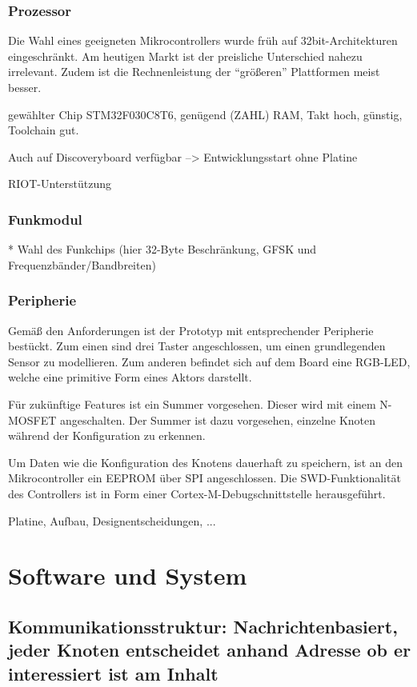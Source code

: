 \documentclass{IEEEtran}
\begin{document}
\subsubsection{Prozessor}
Die Wahl eines geeigneten Mikrocontrollers wurde früh auf 32bit-Architekturen eingeschränkt.
Am heutigen Markt ist der preisliche Unterschied nahezu irrelevant.
Zudem ist die Rechnenleistung der \enquote{größeren} Plattformen meist besser.

gewählter Chip STM32F030C8T6, genügend (ZAHL) RAM, Takt hoch, günstig, Toolchain gut.

Auch auf Discoveryboard verfügbar --> Entwicklungsstart ohne Platine

RIOT-Unterstützung

\subsubsection{Funkmodul}
* Wahl des Funkchips (hier 32-Byte Beschränkung, GFSK und Frequenzbänder/Bandbreiten)

\subsubsection{Peripherie}
Gemäß den Anforderungen ist der Prototyp mit entsprechender Peripherie bestückt.
Zum einen sind drei Taster angeschlossen, um einen grundlegenden Sensor zu modellieren.
Zum anderen befindet sich auf dem Board eine RGB-LED, welche eine primitive Form eines Aktors darstellt.

Für zukünftige Features ist ein Summer vorgesehen.
Dieser wird mit einem N-MOSFET angeschalten.
Der Summer ist dazu vorgesehen, einzelne Knoten während der Konfiguration zu erkennen.

Um Daten wie die Konfiguration des Knotens dauerhaft zu speichern, ist an den Mikrocontroller ein EEPROM über SPI angeschlossen.
Die SWD-Funktionalität des Controllers ist in Form einer Cortex-M-Debugschnittstelle herausgeführt.




    Platine, Aufbau, Designentscheidungen, ...


\section{Software und System}
    \subsection{Kommunikationsstruktur: Nachrichtenbasiert, jeder Knoten entscheidet anhand Adresse ob er interessiert ist am Inhalt}
\end{document}
